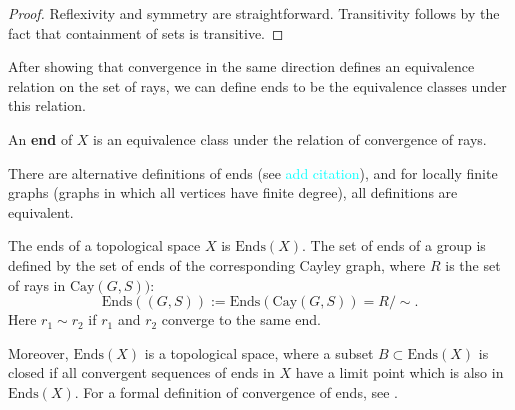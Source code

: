 \begin{proof}
    Reflexivity and symmetry are straightforward. Transitivity follows by the fact that containment of sets is transitive.
\end{proof}

After showing that convergence in the same direction defines an equivalence relation on the set of rays, we can define ends to be the equivalence classes under this relation.
\begin{definition}
\label{endsofgraph}
    An \textbf{end} of \(X\) is an equivalence class under the relation of convergence of rays.  
\end{definition}

\begin{remark}
    There are alternative definitions of ends (see \textcolor{cyan}{add citation}), and for locally finite graphs (graphs in which all vertices have finite degree), all definitions are equivalent.
\end{remark}

\begin{definition}
    The ends of a topological space \(X\) is \(\mathrm{Ends}(X)\). The set of ends of a group is defined by the set of ends of the corresponding Cayley graph, where \(R\) is the set of rays in \(\mathrm{Cay}(G,S))\):
    \[
        \mathrm{Ends}((G,S)) := \mathrm{Ends}(\mathrm{Cay}(G,S)) = R/\sim.
    \]
    Here \(r_1 \sim r_2\) if \(r_1\) and \(r_2\) converge to the same end.
\end{definition}

\begin{remark}
    Moreover, \(\mathrm{Ends}(X)\) is a topological space, where a subset \(B \subset \mathrm{Ends}(X)\) is closed if all convergent sequences of ends in \(X\) have a limit point which is also in \(\mathrm{Ends}(X)\). For a formal definition of convergence of ends, see \cite[p.~144]{bridson_haefliger_metric_1999}.
\end{remark}

\begin{comment}
Let \(E(r)\) be the equivalence class of \(r \in R\). For a sequence of rays \(\{r_n\}_{n \in \mathbb{N}} \in R\), convergence \(E(r_n) \to E(r)\) as \(n\) tends to infinity is defined by the following condition: for every compact set \(C \in X\), there exists a sequence of integers \(N_n\) such that \(r_n[N_n, \infty]\) and \(r[N_n, \infty]\) lie in the same path component of \(X \setminus C\) whenever \(n\) is sufficiently large. A subset \(B \subset \mathrm{Ends}(X)\) is defined to be closed if the following holds: if \(E(r_n) \in B\) for all \(n \in \mathbb{N}\), then \(E(r_n) \to E(r)\) implies \(E(r) \in B\).
\end{comment}


